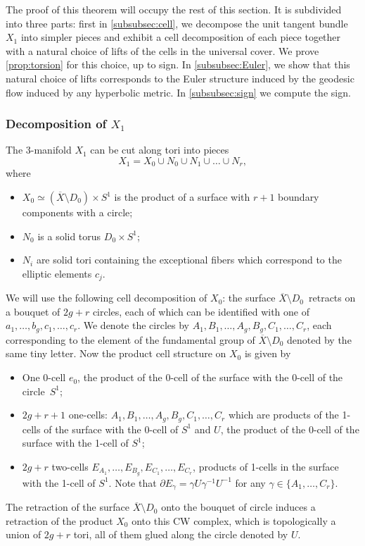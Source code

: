 \documentclass[JEP,XML,SOM,Unicode,NoFloatCountersInSection,published]{cedram}
\theoremstyle{plain}
\theoremstyle{definition}
\theoremstyle{remark}
\numberwithin{equation}{section}
\begin{document}
The proof of this theorem will occupy the rest of this section. It is subdivided into three parts: first in \cref{subsubsec:cell}, we decompose the unit tangent bundle $X_1$ into simpler pieces and exhibit a cell decomposition of each piece together with a natural choice of lifts of the cells in the universal cover. We prove \cref{prop:torsion} for this choice, up to sign.
In \cref{subsubsec:Euler}, we show that this natural choice of lifts corresponds to the Euler structure induced by the geodesic flow induced by any hyperbolic metric. In \cref{subsubsec:sign} we compute the sign.

\label{subsubsec:cell}

\subsubsection*{Decomposition of $X_1$}
The 3\nobreakdash-manifold $X_1$ can be cut along tori into pieces
\begin{equation}
\label{eq:paste}
X_1 = X_0 \cup N_0 \cup N_1 \cup \ldots \cup N_r,
\end{equation}
where
\begin{itemize}
\item
$X_0 \simeq (\overline X \setminus D_0) \times S^1$ is the product of a surface with $r+1$ boundary components with a circle;
\item $N_0$ is a solid torus $D_0 \times S^1$;
\item $N_i$ are solid tori containing the exceptional fibers which correspond to the elliptic elements $c_j$.
\end{itemize}

We will use the following cell decomposition of $X_0$:
the surface $\overline X \!\setminus\! D_0$~\hbox{retracts} on a bouquet of $2g+r$ circles, each of which can be identified with one of $a_1, \ldots, b_g, c_1, \ldots, c_r$. We denote the circles by $A_1, B_1, \ldots, A_g, B_g, C_1, \ldots, C_r$, each corresponding to the element of the fundamental group of $\overline X \setminus D_0$ denoted by the same tiny letter.
Now the product cell structure on $X_0$ is given by
\begin{itemize}
\item One 0-cell $e_0$, the product of the 0-cell of the surface with the 0-cell of the circle~$S^1$;
\item $2g+r+1$ one-cells: $A_1, B_1, \ldots, A_g, B_g, C_1, \ldots, C_r$ which are products of the 1\nobreakdash-cells of the surface with the 0-cell of $S^1$ and $U$, the product of the 0-cell of the surface with the 1-cell of $S^1$;
\item $2g + r$ two-cells $E_{A_1}, \ldots, E_{B_g}, E_{C_1}, \ldots, E_{C_r}$, products of 1-cells in the surface with the 1-cell of $S^1$. Note that $\partial E_{\gamma} = \gamma U \gamma^{-1} U^{-1}$ for any $\gamma \in \{A_1, \ldots, C_r\}$.
\end{itemize}
The retraction of the surface $\overline X \setminus D_0$ onto the bouquet of circle induces a retraction of the product $X_0$ onto this CW complex, which is topologically a union of $2g+r$ tori, all of them glued along the circle denoted by $U$.
\end{document}
